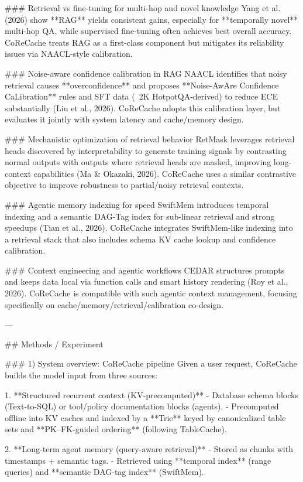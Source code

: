 ### Retrieval vs fine-tuning for multi-hop and novel knowledge  
Yang et al. (2026) show **RAG** yields consistent gains, especially for **temporally novel** multi-hop QA, while supervised fine-tuning often achieves best overall accuracy. CoReCache treats RAG as a first-class component but mitigates its reliability issues via NAACL-style calibration.

### Noise-aware confidence calibration in RAG  
NAACL identifies that noisy retrieval causes **overconfidence** and proposes **Noise-AwAre Confidence CaLibration** rules and SFT data (~2K HotpotQA-derived) to reduce ECE substantially (Liu et al., 2026). CoReCache adopts this calibration layer, but evaluates it jointly with system latency and cache/memory design.

### Mechanistic optimization of retrieval behavior  
RetMask leverages retrieval heads discovered by interpretability to generate training signals by contrasting normal outputs with outputs where retrieval heads are masked, improving long-context capabilities (Ma & Okazaki, 2026). CoReCache uses a similar contrastive objective to improve robustness to partial/noisy retrieval contexts.

### Agentic memory indexing for speed  
SwiftMem introduces temporal indexing and a semantic DAG-Tag index for sub-linear retrieval and strong speedups (Tian et al., 2026). CoReCache integrates SwiftMem-like indexing into a retrieval stack that also includes schema KV cache lookup and confidence calibration.

### Context engineering and agentic workflows  
CEDAR structures prompts and keeps data local via function calls and smart history rendering (Roy et al., 2026). CoReCache is compatible with such agentic context management, focusing specifically on cache/memory/retrieval/calibration co-design.

---

## Methods / Experiment  

### 1) System overview: CoReCache pipeline  
Given a user request, CoReCache builds the model input from three sources:

1. **Structured recurrent context (KV-precomputed)**  
   - Database schema blocks (Text-to-SQL) or tool/policy documentation blocks (agents).  
   - Precomputed offline into KV caches and indexed by a **Trie** keyed by canonicalized table sets and **PK–FK-guided ordering** (following TableCache).

2. **Long-term agent memory (query-aware retrieval)**  
   - Stored as chunks with timestamps + semantic tags.  
   - Retrieved using **temporal index** (range queries) and **semantic DAG-tag index** (SwiftMem).

